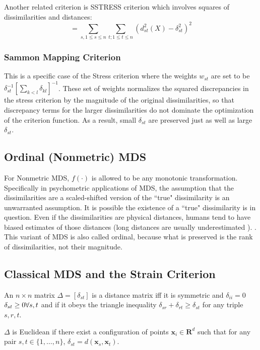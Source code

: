 \documentclass[12pt,oneside,final]{thesis}
\begin{document}
Another related criterion is SSTRESS criterion which involves squares of dissimilarities and distances:
\[
=\sum_{s,1\leq s\leq n}\sum_{t;1\leq t\leq n} { \left(d_{st}^2(X)-\delta_{st}^2\right)^2  }
\]


\subsubsection{Sammon Mapping Criterion}
This is a specific case of the Stress criterion where the weights $w_{st}$ are set to be $\delta_{st}^{-1} \left[\sum_{k<l}\delta_{kl} \right]^{-1}$. These set of weights normalizes the squared discrepancies in the stress criterion by the magnitude of the original dissimilarities, so that discrepancy terms for the larger dissimilarities do not dominate the optimization of the criterion function. As a result, small $\delta_{st}$ are preserved just as well as large $\delta_{st}$.

\subsection{Ordinal (Nonmetric) MDS}
 For Nonmetric MDS, $f(\cdot)$    is allowed to be  any monotonic transformation. Specifically in psychometric applications of MDS, the assumption that the dissimilarities are a scaled-shifted version of the ``true"  dissimilarity is an unwarranted assumption. It is possible the existence of a ``true" dissimilarity is in question. Even if the dissimilarities are physical distances, humans tend to have biased estimates of those distances (long distances are usually underestimated ). \cite{Trosset1998}. This variant of MDS is also called ordinal, because what is preserved is the rank of dissimilarities, not their magnitude.

\subsection{Classical MDS and the Strain Criterion}

An $n \times n$ matrix $\Delta = \left[\delta_{st}\right]$ is a distance matrix iff it is symmetric and $\delta_{ii}=0$ $\delta_{st} \geq 0 \onespace \forall s,t$ and if it obeys the triangle inequality $\delta_{sr}+\delta_{rt} \geq \delta_{st}$ for any triple $s,r,t$.

$\Delta$ is Euclidean if there exist a configuration of points $\bm{x}_{i} \in \mathbf{R}^d$ such that for any pair $s,t \in \{1,\ldots,n\}$,    $\delta_{st}=d(\bm{x}_{s},\bm{x}_{t})$.
\end{document}
